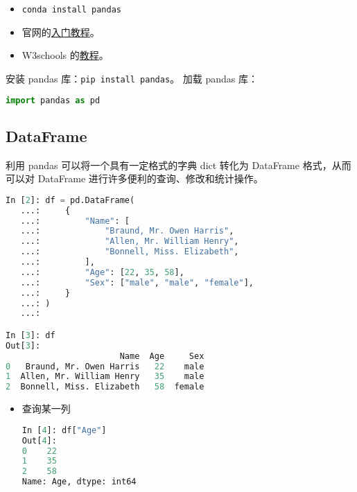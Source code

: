 
\begin{issues}
\issueDraft
\end{issues}

\begin{itemize}
\item \verb|conda install pandas|
\item 官网的\href{https://pandas.pydata.org/docs/getting_started/index.html}{入门教程}。
\item W3schools 的\href{https://www.w3schools.com/python/pandas/default.asp}{教程}。
\end{itemize}
安装 pandas 库：\verb|pip install pandas|。
加载 pandas 库：
\begin{lstlisting}[language=python]
import pandas as pd
\end{lstlisting}
\subsection{DataFrame}
利用 pandas 可以将一个具有一定格式的字典 dict 转化为 DataFrame 格式，从而可以对 DataFrame 进行许多便利的查询、修改和统计操作。
\begin{lstlisting}[language=python]
In [2]: df = pd.DataFrame(
   ...:     {
   ...:         "Name": [
   ...:             "Braund, Mr. Owen Harris",
   ...:             "Allen, Mr. William Henry",
   ...:             "Bonnell, Miss. Elizabeth",
   ...:         ],
   ...:         "Age": [22, 35, 58],
   ...:         "Sex": ["male", "male", "female"],
   ...:     }
   ...: )
   ...: 

In [3]: df
Out[3]: 
                       Name  Age     Sex
0   Braund, Mr. Owen Harris   22    male
1  Allen, Mr. William Henry   35    male
2  Bonnell, Miss. Elizabeth   58  female
\end{lstlisting}
\begin{itemize}
\item 查询某一列
\begin{lstlisting}[language=python]
In [4]: df["Age"]
Out[4]: 
0    22
1    35
2    58
Name: Age, dtype: int64
\end{lstlisting}
\end{itemize}
